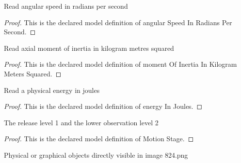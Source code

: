 \begin{definition}
  \label{def:physics:phyx-mini-0824:phyxminiproblems-problemphyxmini0824-angularspeedinradianspersecond}
  Read angular speed in radians per second
\end{definition}
\begin{proof}
  This is the declared model definition of angular Speed In Radians Per Second.
\end{proof}
\begin{definition}
  \label{def:physics:phyx-mini-0824:phyxminiproblems-problemphyxmini0824-momentofinertiainkilogrammeterssquared}
  Read axial moment of inertia in kilogram metres squared
\end{definition}
\begin{proof}
  This is the declared model definition of moment Of Inertia In Kilogram Meters Squared.
\end{proof}
\begin{definition}
  \label{def:physics:phyx-mini-0824:phyxminiproblems-problemphyxmini0824-energyinjoules}
  Read a physical energy in joules
\end{definition}
\begin{proof}
  This is the declared model definition of energy In Joules.
\end{proof}
\begin{definition}
  \label{def:physics:phyx-mini-0824:phyxminiproblems-problemphyxmini0824-motionstage}
  The release level 1 and the lower observation level 2
\end{definition}
\begin{proof}
  This is the declared model definition of Motion Stage.
\end{proof}
\begin{definition}
  \label{def:physics:phyx-mini-0824:phyxminiproblems-problemphyxmini0824-figureobject}
  Physical or graphical objects directly visible in image 824.png
\end{definition}
